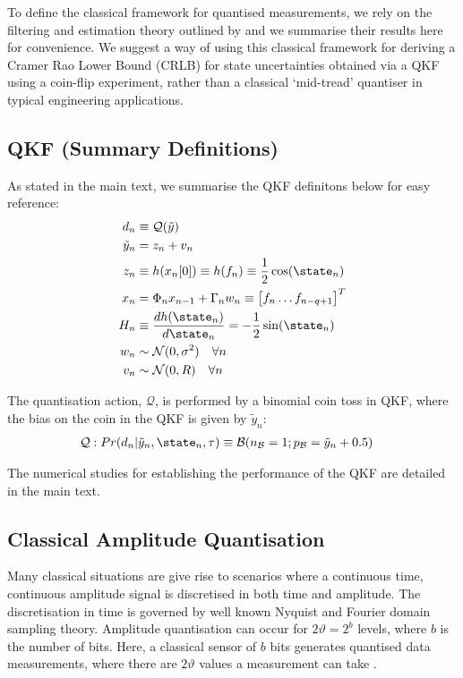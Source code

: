 To define the classical framework for quantised measurements, we rely on the filtering and estimation theory outlined by \cite{widrow1996,karlsson2005} and we summarise their results here for convenience. We suggest a way of using this classical framework for deriving a Cramer Rao Lower Bound (CRLB) for state uncertainties obtained via a QKF using a coin-flip experiment, rather than a classical `mid-tread' quantiser in typical engineering applications. 


\subsection{QKF (Summary Definitions)}

As stated in the main text, we summarise the QKF definitons below for easy reference:
\begin{align}
d_n &\equiv \mathcal{Q}(\tilde{y})\\
\tilde{y}_n &= z_n + v_n \\
z_n & \equiv  h(x_n[0])  \equiv h(f_n) \equiv \frac{1}{2}\cos(\state_{n}) \\
x_n & = \Phi_n x_{n-1} + \Gamma_n w_n  \equiv  \begin{bmatrix} f_{n} \hdots f_{n-q+1} \end{bmatrix}^T \\
H_n &\equiv \frac{d h(\state_n)}{d\state_n} =  -\frac{1}{2}\sin(\state_{n}) \\
w_n & \sim \mathcal{N}(0, \sigma^2) \quad \forall n \\
v_n & \sim \mathcal{N}(0, R) \quad \forall n
\end{align}

The quantisation action, $\mathcal{Q}$, is performed by a binomial coin toss in QKF, where the bias on the coin in the QKF is given by $\tilde{y}_n$:
\begin{align}
\mathcal{Q}: Pr(d_n| \tilde{y}_n, \state_{n}, \tau) & \equiv \mathcal{B}(n_{\mathcal{B}}=1;p_{\mathcal{B}}= \tilde{y}_n + 0.5 ) \label{eqn:app:coinflipquantiser}
\end{align}

The numerical studies for establishing the performance of the QKF are detailed in the main text. 

\subsection{Classical Amplitude Quantisation}

Many classical situations are give rise to scenarios where a continuous time, continuous amplitude signal is discretised in both time and amplitude. The discretisation in time is governed by well known Nyquist and Fourier domain sampling theory. Amplitude quantisation can occur for $2\vartheta = 2^b$ levels, where $b$ is the number of bits. Here, a  classical sensor of $b$ bits generates quantised data measurements, where there are  $2\vartheta$ values a measurement can take \cite{karlsson2005}. 

